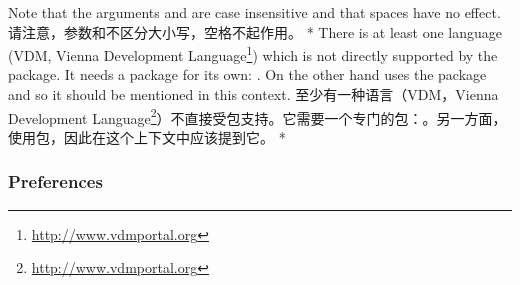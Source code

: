 \begin{paracol}{2}
Note that the arguments  and  are case
insensitive and that spaces have no effect.
\switchcolumn
请注意，参数和不区分大小写，空格不起作用。
\switchcolumn[0]*%
There is at least one language (VDM, Vienna Development Language\footnote{\url{http://www.vdmportal.org}}) which is not directly supported by the
 package. It needs a package for its own:
. On the other hand  uses
the  package and so it should be mentioned in this
context.
\switchcolumn
至少有一种语言（VDM，Vienna Development Language\footnote{\url{http://www.vdmportal.org}}）不直接受包支持。它需要一个专门的包：。另一方面，使用包，因此在这个上下文中应该提到它。
\switchcolumn[0]*%
\subsubsection{Preferences}\label{uPreferences}
\switchcolumn

\end{paracol}
